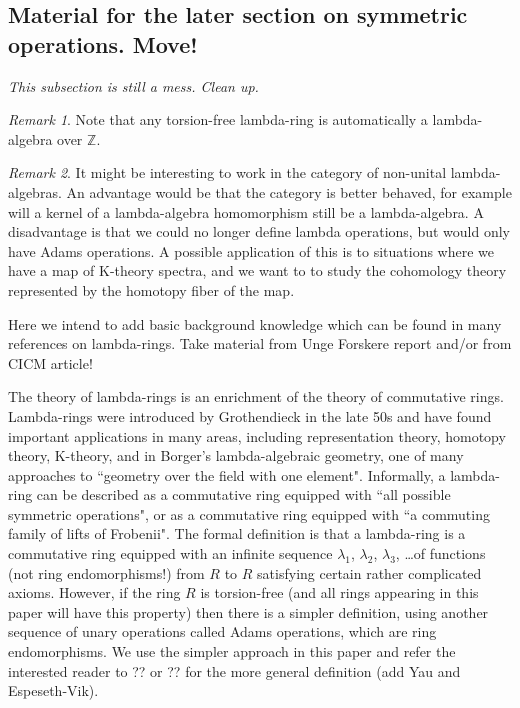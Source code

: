 \documentclass[a4paper]{article}
\theoremstyle{definition}
\theoremstyle{remark}
\newtheorem*{remark}{Remark}
\begin{document}
\subsection*{Material for the later section on symmetric operations. Move!}

\emph{This subsection is still a mess. Clean up.}

\begin{remark}
Note that any torsion-free lambda-ring is automatically a lambda-algebra over $\mathbb{Z}$.
\end{remark}

\begin{remark}
It might be interesting to work in the category of non-unital lambda-algebras. An advantage would be that the category is better behaved, for example will a kernel of a lambda-algebra homomorphism still be a lambda-algebra. A disadvantage is that we could no longer define lambda operations, but would only have Adams operations. A possible application of this is to situations where we have a map of K-theory spectra, and we want to to study the cohomology theory represented by the homotopy fiber of the map.
\end{remark}

Here we intend to add basic background knowledge which can be found in many references on lambda-rings. Take material from Unge Forskere report and/or from CICM article!

The theory of lambda-rings is an enrichment of the theory of commutative rings. Lambda-rings were introduced by Grothendieck in the late 50s and have found important applications in many areas, including representation theory, homotopy theory, K-theory, and in Borger's lambda-algebraic geometry, one of many approaches to ``geometry over the field with one element". Informally, a lambda-ring can be described as a commutative ring equipped with ``all possible symmetric operations", or as a commutative ring equipped with ``a commuting family of lifts of Frobenii". The formal definition is that a lambda-ring is a commutative ring equipped with an infinite sequence $\lambda_1$, $\lambda_2$, $\lambda_3$, \ldots of functions (not ring endomorphisms!) from $R$ to $R$ satisfying certain rather complicated axioms. However, if the ring $R$ is torsion-free (and all rings appearing in this paper will have this property) then there is a simpler definition, using another sequence of unary operations called Adams operations, which are ring endomorphisms. We use the simpler approach in this paper and refer the interested reader to ?? or ?? for the more general definition (add Yau and Espeseth-Vik). 
\end{document}
